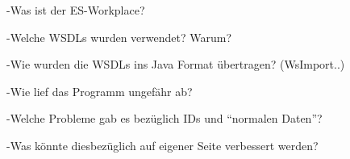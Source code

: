 -Was ist der ES-Workplace?

-Welche WSDLs wurden verwendet? Warum?

-Wie wurden die WSDLs ins Java Format übertragen? (WsImport..)

-Wie lief das Programm ungefähr ab?

-Welche Probleme gab es bezüglich IDs und ``normalen Daten''?

-Was könnte diesbezüglich auf eigener Seite verbessert werden?

